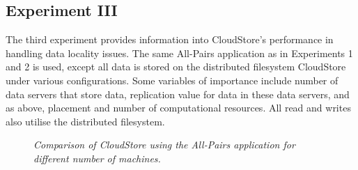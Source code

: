 \documentclass{rspublic}
\begin{document}
\subsection{Experiment III} The third experiment provides information
into CloudStore's performance in handling data locality issues. The
same All-Pairs application as in Experiments 1 and 2 is used, except all
data is stored on the distributed filesystem CloudStore under various
configurations. Some variables of importance include number of data
servers that store data, replication value for data in these data
servers, and as above, placement and number of computational resources.
All read and writes also utilise the distributed filesystem. 
\begin{center}
\begin{figure}
\caption{\textit{Comparison of CloudStore using the All-Pairs
application for different number of machines.}}
\label{experiment3}
\end{figure}
\end{center}
\end{document}
